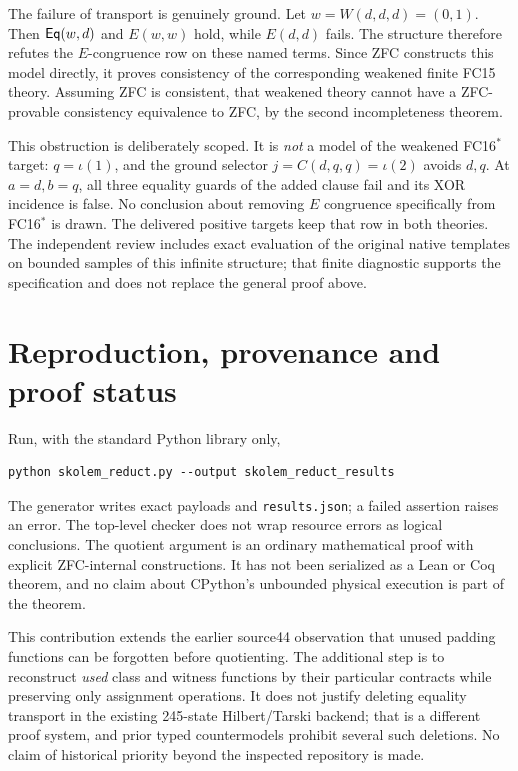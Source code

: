 The failure of transport is genuinely ground. Let $w=W(d,d,d)=(0,1)$.
Then $\mathsf{Eq}(w,d)$ and $E(w,w)$ hold, while $E(d,d)$ fails. The structure
therefore refutes the $E$-congruence row on these named terms.
Since ZFC constructs this model directly, it proves consistency of the
corresponding weakened finite FC15 theory. Assuming ZFC is consistent,
that weakened theory cannot have a ZFC-provable consistency equivalence
to ZFC, by the second incompleteness theorem.

This obstruction is deliberately scoped. It is \emph{not} a model of
the weakened FC16$^*$ target: $q=\iota(1)$, and the ground selector
$j=C(d,q,q)=\iota(2)$ avoids $d,q$. At $a=d,b=q$, all three equality
guards of the added clause fail and its XOR incidence is false.
No conclusion about removing $E$ congruence specifically from FC16$^*$
is drawn. The delivered positive targets keep that row in both theories.
The independent review includes exact evaluation of the original native
templates on bounded samples of this infinite structure; that finite
diagnostic supports the specification and does not replace the general
proof above.

\section{Reproduction, provenance and proof status}

Run, with the standard Python library only,
\begin{verbatim}
python skolem_reduct.py --output skolem_reduct_results
\end{verbatim}
The generator writes exact payloads and \texttt{results.json}; a failed
assertion raises an error. The top-level checker does not wrap resource
errors as logical conclusions. The quotient argument is an ordinary
mathematical proof with explicit ZFC-internal constructions. It has not
been serialized as a Lean or Coq theorem, and no claim about CPython's
unbounded physical execution is part of the theorem.

This contribution extends the earlier source44 observation that unused
padding functions can be forgotten before quotienting. The additional
step is to reconstruct \emph{used} class and witness functions by their
particular contracts while preserving only assignment operations. It does
not justify deleting equality transport in the existing 245-state
Hilbert/Tarski backend; that is a different proof system, and prior
typed countermodels prohibit several such deletions. No claim of
historical priority beyond the inspected repository is made.

